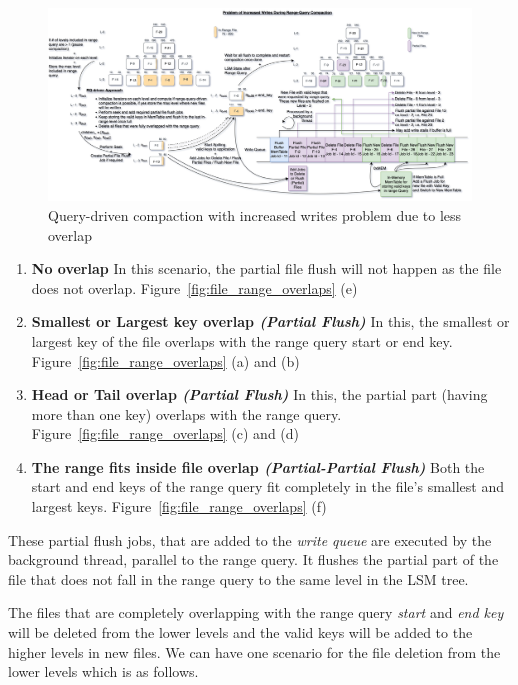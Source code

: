 \begin{figure}
    \includegraphics[scale=0.12]{Figures/RQ-driven problem of increased writes.png}
    \caption{Query-driven compaction with increased writes problem due to less overlap}\label{fig:query-driven_compaction_with_increased_writes}
\end{figure}

\begin{enumerate}[leftmargin=*,labelindent=0mm, itemsep=0.2\baselineskip]
    \item \textbf{No overlap} In this scenario, the partial file flush will not happen as the file does not overlap. 
    Figure~\ref{fig:file_range_overlaps} (e)
    \item \textbf{Smallest or Largest key overlap \textit{(Partial Flush)}} In this, the smallest or largest key of the 
    file overlaps with the range query start or end key. Figure~\ref{fig:file_range_overlaps} (a) and (b)
    \item \textbf{Head or Tail overlap \textit{(Partial Flush)}} In this, the partial part (having more than one key) 
    overlaps with the range query. Figure~\ref{fig:file_range_overlaps} (c) and (d)
    \item \textbf{The range fits inside file overlap \textit{(Partial-Partial Flush)}} Both the start and end keys of 
    the range query fit completely in the file's smallest and largest keys. Figure~\ref{fig:file_range_overlaps} (f)
\end{enumerate}

These partial flush jobs, that are added to the \textit{write queue} are executed by the background thread, 
parallel to the range query. It flushes the partial part of the file that does not fall in the range query to the same 
level in the LSM tree.

The files that are completely overlapping with the range query \textit{start} and \textit{end key} will be deleted from the lower 
levels and the valid keys will be added to the higher levels in new files. We can have one scenario for the file 
deletion from the lower levels which is as follows.

